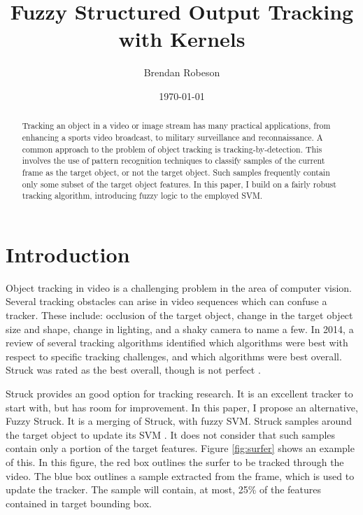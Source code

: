 \documentclass{IEEEtran}
\begin{document}
\title{Fuzzy Structured Output Tracking with Kernels}
\author{Brendan Robeson}
\date{\today}
\maketitle

\begin{abstract} %
    Tracking an object in a video or image stream has many practical applications, from enhancing a
    sports video broadcast, to military surveillance and reconnaissance. A common approach to the
    problem of object tracking is tracking-by-detection. This involves the use of pattern
    recognition techniques to classify samples of the current frame as the target object, or not the
    target object. Such samples frequently contain only some subset of the target object features.
    In this paper, I build on a fairly robust tracking algorithm, introducing fuzzy logic to the
    employed SVM.
\end{abstract}

\section{Introduction} %
Object tracking in video is a challenging problem in the area of computer vision. Several tracking
obstacles can arise in video sequences which can confuse a tracker. These include: occlusion of the
target object, change in the target object size and shape, change in lighting, and a shaky camera to
name a few. In 2014, a review of several tracking algorithms \cite{6671560} identified which
algorithms were best with respect to specific tracking challenges, and which algorithms were best
overall. Struck \cite{6126251} was rated as the best overall, though is not perfect \cite{6671560}.

Struck provides an good option for tracking research. It is an excellent tracker to start with, but
has room for improvement. In this paper, I propose an alternative, Fuzzy Struck. It is a merging of
Struck, with fuzzy SVM. Struck samples around the target object to update its SVM \cite{6126251}. It
does not consider that such samples contain only a portion of the target features. Figure
\ref{fig:surfer} shows an example of this. In this figure, the red box outlines the surfer to be
tracked through the video. The blue box outlines a sample extracted from the frame, which is used to
update the tracker. The sample will contain, at most, 25\% of the features contained in target
bounding box.
\end{document}
